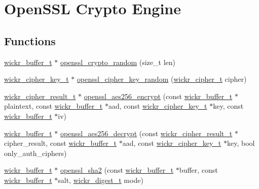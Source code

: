 \hypertarget{group__openssl__crypto}{}\section{Open\+S\+SL Crypto Engine}
\label{group__openssl__crypto}
\subsection*{Functions}
\begin{DoxyCompactItemize}
\item 
\hyperlink{structwickr__buffer}{wickr\+\_\+buffer\+\_\+t} $\ast$ \hyperlink{group__openssl__crypto_gadfe740d19f9f2096b818553e90dae0d7}{openssl\+\_\+crypto\+\_\+random} (size\+\_\+t len)
\item 
\hyperlink{structwickr__cipher__key}{wickr\+\_\+cipher\+\_\+key\+\_\+t} $\ast$ \hyperlink{group__openssl__crypto_ga9177055e488f0163d3eb946799df5a67}{openssl\+\_\+cipher\+\_\+key\+\_\+random} (\hyperlink{structwickr__cipher}{wickr\+\_\+cipher\+\_\+t} cipher)
\item 
\hyperlink{structwickr__cipher__result}{wickr\+\_\+cipher\+\_\+result\+\_\+t} $\ast$ \hyperlink{group__openssl__crypto_gaf51493d43d3572265abba27e2b3fbc54}{openssl\+\_\+aes256\+\_\+encrypt} (const \hyperlink{structwickr__buffer}{wickr\+\_\+buffer\+\_\+t} $\ast$plaintext, const \hyperlink{structwickr__buffer}{wickr\+\_\+buffer\+\_\+t} $\ast$aad, const \hyperlink{structwickr__cipher__key}{wickr\+\_\+cipher\+\_\+key\+\_\+t} $\ast$key, const \hyperlink{structwickr__buffer}{wickr\+\_\+buffer\+\_\+t} $\ast$iv)
\item 
\hyperlink{structwickr__buffer}{wickr\+\_\+buffer\+\_\+t} $\ast$ \hyperlink{group__openssl__crypto_ga75eaf118b28fb76e75579d0a74517b18}{openssl\+\_\+aes256\+\_\+decrypt} (const \hyperlink{structwickr__cipher__result}{wickr\+\_\+cipher\+\_\+result\+\_\+t} $\ast$cipher\+\_\+result, const \hyperlink{structwickr__buffer}{wickr\+\_\+buffer\+\_\+t} $\ast$aad, const \hyperlink{structwickr__cipher__key}{wickr\+\_\+cipher\+\_\+key\+\_\+t} $\ast$key, bool only\+\_\+auth\+\_\+ciphers)
\item 
\hyperlink{structwickr__buffer}{wickr\+\_\+buffer\+\_\+t} $\ast$ \hyperlink{group__openssl__crypto_ga19991a9b00d0c383c64935fa2acecda7}{openssl\+\_\+sha2} (const \hyperlink{structwickr__buffer}{wickr\+\_\+buffer\+\_\+t} $\ast$buffer, const \hyperlink{structwickr__buffer}{wickr\+\_\+buffer\+\_\+t} $\ast$salt, \hyperlink{structwickr__digest}{wickr\+\_\+digest\+\_\+t} mode)

\end{DoxyCompactItemize}
